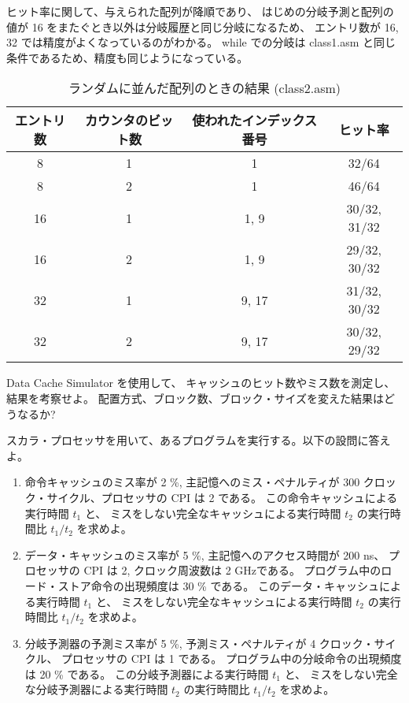 \documentclass[11pt,dvipdfmx,a4paper]{jsarticle}
\begin{document}
ヒット率に関して、与えられた配列が降順であり、
はじめの分岐予測と配列の値が 16 をまたぐとき以外は分岐履歴と同じ分岐になるため、
エントリ数が 16, 32 では精度がよくなっているのがわかる。
while での分岐は class1.asm と同じ条件であるため、精度も同じようになっている。

\begin{table}[H]
    \centering
    \caption{ランダムに並んだ配列のときの結果 (class2.asm)}
    \label{table:02}
    \begin{tabular}{cccc}
        \hline
        エントリ数 & カウンタのビット数 & 使われたインデックス番号 & ヒット率\\
        \hline
        8 & 1 & 1 & 32/64\\
        8 & 2 & 1 & 46/64\\
        16 & 1 & 1, 9 & 30/32, 31/32\\
        16 & 2 & 1, 9 & 29/32, 30/32\\
        32 & 1 & 9, 17 & 31/32, 30/32\\
        32 & 2 & 9, 17 & 30/32, 29/32\\
        \hline
    \end{tabular}
\end{table}


\begin{tcolorbox}[colbacktitle=white, coltitle=black, colback=white, title=課題2]
    Data Cache Simulator を使用して、
    キャッシュのヒット数やミス数を測定し、結果を考察せよ。
    配置方式、ブロック数、ブロック・サイズを変えた結果はどうなるか?
\end{tcolorbox}


\begin{tcolorbox}[colbacktitle=white, coltitle=black, colback=white, title=課題3]
    スカラ・プロセッサを用いて、あるプログラムを実行する。以下の設問に答えよ。
    \begin{enumerate}
        \item 命令キャッシュのミス率が 2 \%,
        主記憶へのミス・ペナルティが 300 クロック・サイクル、プロセッサの CPI は 2 である。
        この命令キャッシュによる実行時間 \(t_1\) と、
        ミスをしない完全なキャッシュによる実行時間 \(t_2\) の実行時間比 \(t_1/t_2\) を求めよ。
        \item データ・キャッシュのミス率が 5 \%,
        主記憶へのアクセス時間が 200 ns、
        プロセッサの CPI は 2, クロック周波数は 2 GHzである。
        プログラム中のロード・ストア命令の出現頻度は 30 \% である。
        このデータ・キャッシュによる実行時間 \(t_1\) と、
        ミスをしない完全なキャッシュによる実行時間 \(t_2\) の実行時間比 \(t_1/t_2\) を求めよ。
        \item 分岐予測器の予測ミス率が 5 \%,
        予測ミス・ペナルティが 4 クロック・サイクル、
        プロセッサの CPI は 1 である。
        プログラム中の分岐命令の出現頻度は 20 \% である。
        この分岐予測器による実行時間 \(t_1\) と、
        ミスをしない完全な分岐予測器による実行時間 \(t_2\) の実行時間比 \(t_1/t_2\) を求めよ。
    \end{enumerate}
\end{tcolorbox}
\end{document}

